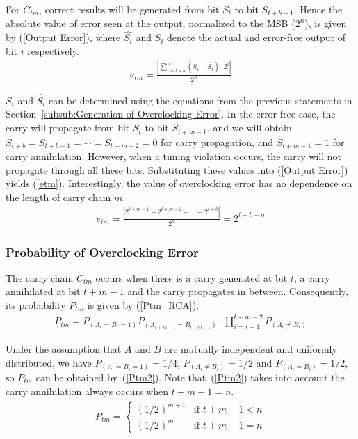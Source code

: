 \documentclass[prodmode,acmtrets]{acmsmall} %
\begin{document}
For $C_{tm}$, correct results will be generated from bit $S_t$ to bit $S_{t+b-1}$. Hence the absolute value of error seen at the output, normalized to the MSB ($2^n$), is given by (\ref{Output Error}), where $\hat{S_i}$ and $S_i$ denote the actual and error-free output of bit $i$ respectively.
%
\begin{eqnarray}\label{Output Error}
    e_{tm}=\frac{\left|\sum_{i=t+b}^{n}(S_i-\hat{S_i})\cdot 2^i\right|}{2^n}
\end{eqnarray}

$S_i$ and $\hat{S_i}$ can be determined using the equations from the previous statements in Section~\ref{subsub:Generation of Overclocking Error}. In the error-free case, the carry will propagate from bit $S_t$ to bit $S_{t+m-1}$, and we will obtain $S_{t+b}=S_{t+b+1}=\cdots=S_{t+m-2}=0$ for carry propagation, and $S_{t+m-1}=1$ for carry annihilation. However, when a timing violation occurs, the carry will not propagate through all these bits. Substituting these values into (\ref{Output Error}) yields (\ref{etm}). Interestingly, the value of overclocking error has no dependence on the length of carry chain $m$.
%
\begin{eqnarray}\label{etm}
    e_{tm} = \frac{\left|2^{t+m-1}-2^{t+m-2}-\dots-2^{t+b}\right|}{2^n} = 2^{t+b-n}
\end{eqnarray}

\subsubsection{Probability of Overclocking Error}
The carry chain $C_{tm}$ occurs when there is a carry generated at bit $t$, a carry annihilated at bit $t+m-1$ and the carry propagates in between. Consequently, its probability $P_{tm}$ is given by (\ref{Ptm_RCA}).
%
\begin{eqnarray}\label{Ptm_RCA}
  P_{tm}=P_{(A_t=B_t=1)}P_{(A_{t+m-1}=B_{t+m-1})}\cdot \prod_{i=t+1}^{t+m-2}P_{(A_i\neq B_i)}
\end{eqnarray}

Under the assumption that $A$ and $B$ are mutually independent and uniformly distributed, we have $P_{(A_i=B_i=1)}=1/4$, $P_{(A_i\neq B_i)}=1/2$ and $P_{(A_i=B_i)}=1/2$, so $P_{tm}$ can be obtained by~(\ref{Ptm2}). Note that~(\ref{Ptm2}) takes into account the carry annihilation always occurs when $t+m-1=n$.
%
\begin{eqnarray}\label{Ptm2}
    P_{tm}=\left\{\begin{array}{ll}
      (1/2)^{m+1} & \textrm{if $t+m-1<n$}\\
      (1/2)^{m} & \textrm{if $t+m-1=n$}
    \end{array} \right.
\end{eqnarray}
\end{document}
